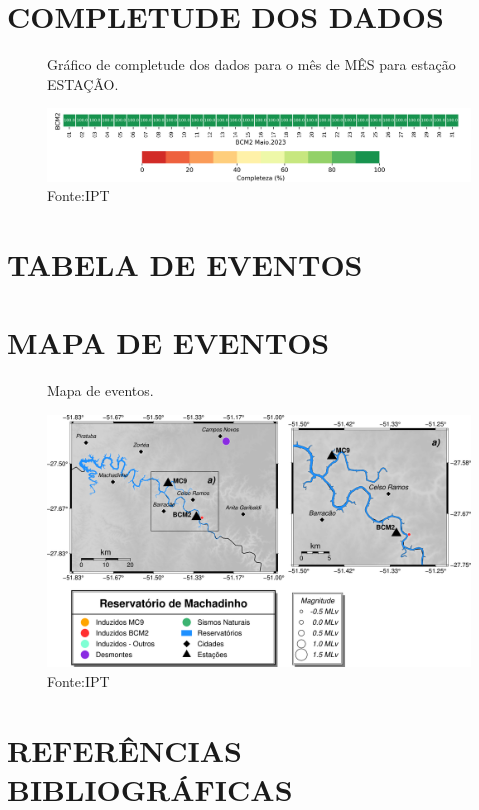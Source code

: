 \documentclass[12pt]{iptex}
\renewcommand{\refname}{REFERÊNCIAS}
\renewcommand{\refname}{REFERENCES}
\begin{document}
\section{COMPLETUDE DOS DADOS}
\label{fig:completude}
\begin{figure}[htb!]
    \centering
	\captionsetup{justification=raggedright,
                  singlelinecheck=false,
                  width=0.4\textwidth,
                  format=plain}
    \caption{Gráfico de completude dos dados para o mês de MÊS para estação ESTAÇÃO.}
    \includegraphics[width=1.0\textwidth]{../figuras/completude.png} %
    \caption*{Fonte:IPT}
	\label{fig:logo}
\end{figure}

\section{TABELA DE EVENTOS}
\label{sec:tabelas}


\newpage

\section{MAPA DE EVENTOS}
\label{sec:mapa}
\begin{figure}[ht]
    \centering
    \caption{Mapa de eventos.}
    \includegraphics[width=1.0\textwidth]{../figuras/mapaevents.png} %
    \caption*{Fonte:IPT}
\end{figure}

\newpage

\section{REFERÊNCIAS BIBLIOGRÁFICAS}
%
\pageref{LastPage}
\label{pag:fim}

\pagebreak
\clearpage

\end{document}
